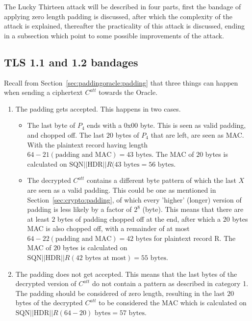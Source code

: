 \documentclass[10pt,conference,a4paper]{IEEEtran}
\begin{document}
The Lucky Thirteen attack will be described in four parts, first the bandage of applying zero length padding is discussed, after which the complexity of the attack is explained, thereafter the practicality of this attack is discussed, ending in a subsection which point to some possible improvements of the attack.

\subsection{TLS 1.1 and 1.2 bandages}
\label{sec:lucky:bandage}
Recall from Section~\ref{sec:paddingoracle:padding} that three things can happen when sending a ciphertext $C^{att}$ towards the Oracle.
\begin{enumerate}
  \item The padding gets accepted. This happens in two cases.
	\begin{itemize}
		\item The last byte of $P_4$ ends with a $0\text{x}00$ byte. This is seen as valid padding, and chopped off. The last $20$ bytes of $P_4$ that are left, are seen as MAC. With the plaintext record having length $64 - 21 (\text{padding and MAC}) = 43 \text{ bytes}$. The MAC of $20$ bytes is calculated on $\text{SQN} || \text{HDR} || R (43 \text{ bytes} = 56\text{ bytes}$.
		\item The decrypted $C^{att}$ contains a different byte pattern of which the last $X$ are seen as a valid padding. This could be one as mentioned in Section~\ref{sec:crypto:padding}, of which every 'higher' (longer) version of padding is less likely by a factor of $2^8$ (byte). This means that there are at least $2$ bytes of padding chopped off at the end, after which a $20$ bytes MAC is also chopped off, with a remainder of at most $64 - 22 (\text{padding and MAC}) = 42 \text{ bytes}$ for plaintext record R. The MAC of $20$ bytes is calculated on $\text{SQN} || \text{HDR} || R (42 \text{ bytes at most}) = 55\text{ bytes}$.
	\end{itemize}
  \item The padding does not get accepted. This means that the last bytes of the decrypted version of $C^{att}$ do not contain a pattern as described in category 1. The padding should be considered of zero length, resulting in the last $20$ bytes of the decrypted $C^{att}$ to be considered the MAC which is calculated on $\text{SQN} || \text{HDR} || R (64 - 20) \text{ bytes} = 57\text{ bytes}$.
\end{enumerate}
\end{document}
